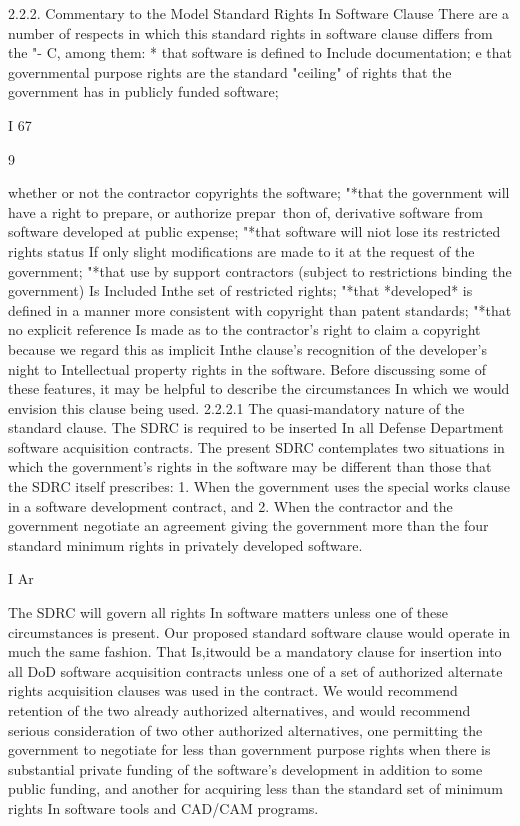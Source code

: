 \documentclass[12pt]{article}
\begin{document}
2.2.2. Commentary to the Model Standard Rights In Software Clause
There are a number of respects in which this standard rights in software clause differs from the
"- C, among them:
* that software is defined to Include documentation;
e that governmental purpose rights are the standard "ceiling" of rights that the government
has in publicly funded software;

I
67

9

whether or not the contractor copyrights the software;
"*that the government will have a right to prepare, or authorize prepar~thon of, derivative
software from software developed at public expense;
"*that software will niot lose its restricted rights status If only slight modifications are made
to it at the request of the government;
"*that use by support contractors (subject to restrictions binding the government) Is Included Inthe set of restricted rights;
"*that *developed* is defined in a manner more consistent with copyright than patent standards;
"*that no explicit reference Is made as to the contractor's right to claim a copyright because
we regard this as implicit Inthe clause's recognition of the developer's night to Intellectual
property rights in the software.
Before discussing some of these features, it may be helpful to describe the circumstances In which
we would envision this clause being used.
2.2.2.1 The quasi-mandatory nature of the standard clause.
The SDRC is required to be inserted In all Defense Department software acquisition contracts. The
present SDRC contemplates two situations in which the government's rights in the software may be
different than those that the SDRC itself prescribes:
1. When the government uses the special works clause in a software development contract, and
2. When the contractor and the government negotiate an agreement giving the government more than the four standard minimum rights in privately developed software.

I
Ar

The SDRC will govern all rights In software matters unless one of these circumstances is present.
Our proposed standard software clause would operate in much the same fashion. That Is,itwould be
a mandatory clause for insertion into all DoD software acquisition contracts unless one of a set of
authorized alternate rights acquisition clauses was used in the contract. We would recommend retention of the two already authorized alternatives, and would recommend serious consideration of two
other authorized alternatives, one permitting the government to negotiate for less than government
purpose rights when there is substantial private funding of the software's development in addition to
some public funding, and another for acquiring less than the standard set of minimum rights In software tools and CAD/CAM programs.
\end{document}
